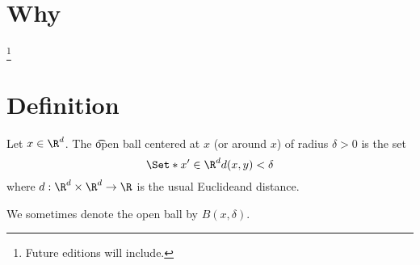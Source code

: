 
\section{Why}\footnote{Future editions will include.}

\section{Definition}

Let $x \in \R^d$.
The \t{open ball} centered at $x$ (or around $x$) of radius $\delta > 0$ is the set
\[
    \Set*{x' \in \R^{d}}{d(x, y) < \delta}
\]
where $d: \R^d \times \R^d \to \R$ is the usual Euclideand distance.


We sometimes denote the open ball by $B(x,\delta)$.


\blankpage
